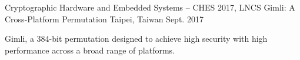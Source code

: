 \newpage
{}


\begin{cventries}

  \cventry
    {Cryptographic Hardware and Embedded Systems – CHES 2017, LNCS}
    {Gimli: A Cross-Platform Permutation} %
    {Taipei, Taiwan} %
    {Sept. 2017} %
    {
      \begin{cvitems} %
        \item {Gimli, a 384-bit permutation designed to achieve high security with high performance across a broad range of platforms.}
      \end{cvitems}
    }


\end{cventries}
